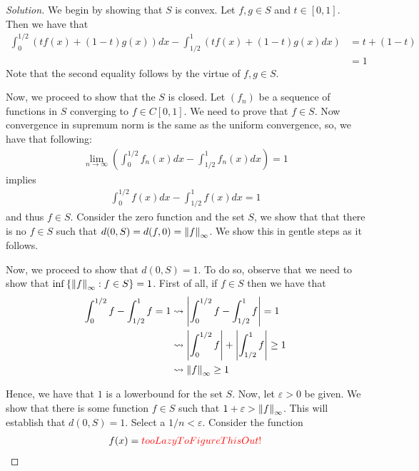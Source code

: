 \horz
\begin{proof}[Solution]
   We begin by showing that $S$ is convex. Let $f, g \in S$ and $t\in [0,1]$. Then we have that 
    \begin{align*}
	\int_{0}^{1/2} \left( t f\left( x \right) + \left( 1-t \right) g\left( x \right)\right) dx - \int_{1/2}^{1} \left( t f\left( x \right) + \left( 1-t \right) g\left( x \right) dx  \right) &= t + (1-t) \\
	&= 1
    \end{align*}
    Note that the second equality follows by the virtue of $f,g \in S$.

    Now, we proceed to show that the $S$ is closed. Let $\left( f_{n} \right) $ be a sequence of functions in $S$ converging to $f \in C\left[ 0,1 \right]$. We need to prove that $f \in S$. Now convergence in supremum norm is the same as the uniform convergence, so, we have that following:
    \begin{align*}
	\lim_{n\to \infty}\left( \int_{0}^{1/2} f_{n}\left( x \right) dx - \int_{1/2}^{1} f_{n} \left( x \right) dx \right) =1
    \end{align*}
    implies 
    \begin{align*}
\int_{0}^{1/2} f\left( x \right) dx - \int_{1/2}^{1} f \left( x \right) dx =1 
\end{align*}
and thus $f \in S$.
Consider the zero function and the set $S$, we show that that there is no $f \in S$ such that $d (0,S) = d(f,0)=\left\lVert f \right\rVert_{\infty}$. We show this in gentle steps as it follows.

Now, we proceed to show that $d\left( 0,S \right) = 1$. To do so, observe that we need to show that $\inf \left\{ \left\lVert f \right\rVert _{\infty} : f \in S \right\} = 1$. First of all, if $f\in S$ then we have that 
\begin{align*}
    \int_{0}^{1/2} f - \int_{1/2}^{1} f =1 & \leadsto \left\lvert \int_{0}^{1/2} f - \int_{1/2}^{1} f  \right\rvert =1  \\
&\leadsto  \left\lvert \int_{0}^{1/2} f \right\rvert +\left\lvert  \int_{1/2}^{1} f  \right\rvert \ge 1  \\
&\leadsto \left\lVert f \right\rVert_{\infty} \ge 1
\end{align*}

Hence, we have that $1$ is a lowerbound for the set $S$. Now, let $\varepsilon > 0$ be given. We show that there is some function $f \in S$ such that $1 + \varepsilon > \left\lVert f \right\rVert_{\infty}$. This will establish that $d\left( 0,S \right) = 1$. Select a $1/n < \varepsilon$.
Consider the function
\begin{align*}
    f(x) = \color{red}{tooLazyToFigureThisOut!}  
\end{align*}


\end{proof}
